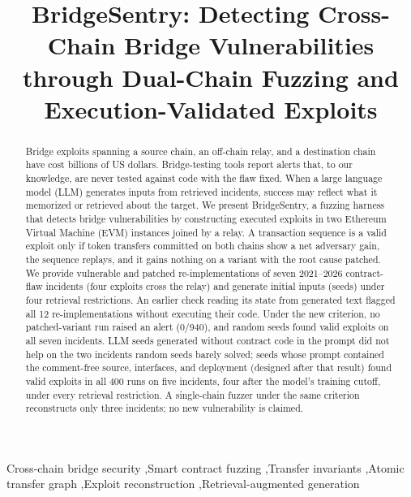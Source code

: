 \documentclass[a4paper]{cas-sc}
\begin{document}

\title[mode=title]{BridgeSentry: Detecting Cross-Chain Bridge Vulnerabilities through Dual-Chain Fuzzing and Execution-Validated Exploits}

\begin{abstract}
Bridge exploits spanning a source chain, an off-chain relay, and a destination chain have cost billions of US dollars. Bridge-testing tools report alerts that, to our knowledge, are never tested against code with the flaw fixed. When a large language model (LLM) generates inputs from retrieved incidents, success may reflect what it memorized or retrieved about the target. We present BridgeSentry, a fuzzing harness that detects bridge vulnerabilities by constructing executed exploits in two Ethereum Virtual Machine (EVM) instances joined by a relay. A transaction sequence is a valid exploit only if token transfers committed on both chains show a net adversary gain, the sequence replays, and it gains nothing on a variant with the root cause patched. We provide vulnerable and patched re-implementations of seven 2021--2026 contract-flaw incidents (four exploits cross the relay) and generate initial inputs (seeds) under four retrieval restrictions. An earlier check reading its state from generated text flagged all 12 re-implementations without executing their code. Under the new criterion, no patched-variant run raised an alert (0/940), and random seeds found valid exploits on all seven incidents. LLM seeds generated without contract code in the prompt did not help on the two incidents random seeds barely solved; seeds whose prompt contained the comment-free source, interfaces, and deployment (designed after that result) found valid exploits in all 400 runs on five incidents, four after the model's training cutoff, under every retrieval restriction. A single-chain fuzzer under the same criterion reconstructs only three incidents; no new vulnerability is claimed.
\end{abstract}

\begin{keywords}
Cross-chain bridge security \sep Smart contract fuzzing \sep Transfer invariants \sep Atomic transfer graph \sep Exploit reconstruction \sep Retrieval-augmented generation
\end{keywords}

{\hfuzz=120pt\maketitle}
\suppressfloats[t]
\end{document}
